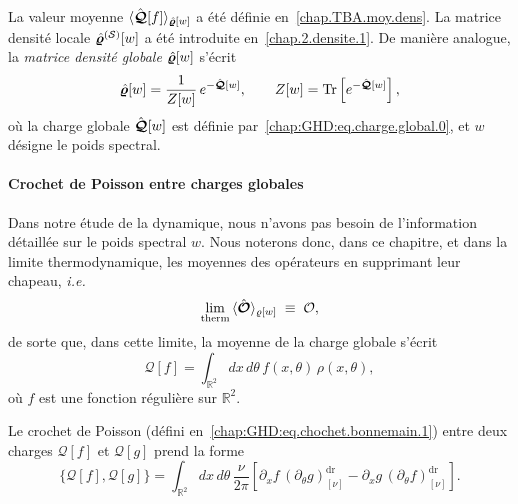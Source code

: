 \medskip

La valeur moyenne $\langle \hat{\bm{\mathcal{Q}}}[f] \rangle_{\hat{\bm{\varrho}}[w]}$ a été définie en~\eqref{chap.TBA.moy.dens}.  
La matrice densité locale $\hat{\bm{\varrho}}^{(\mathcal{S})}[w]$ a été introduite en~\eqref{chap.2.densite.1}.  
De manière analogue, la \emph{matrice densité globale} $\hat{\bm{\varrho}}[w]$ s’écrit
\begin{equation}\label{chap:GHD:eq.charge.global.2}
	\hat{\bm{\varrho}}[w] 
	= \frac{1}{Z[w]}\, e^{-\hat{\bm{\mathcal{Q}}}[w]}, 
	\qquad  
	Z[w] = \mathrm{Tr} \left[ e^{-\hat{\bm{\mathcal{Q}}}[w]} \right],
\end{equation}
où la charge globale $\hat{\bm{\mathcal{Q}}}[w]$ est définie par~\eqref{chap:GHD:eq.charge.global.0}, et $w$ désigne le poids spectral.  


\medskip

\paragraph{Crochet de Poisson entre charges globales}  
Dans notre étude de la dynamique, nous n’avons pas besoin de l’information détaillée sur le poids spectral $w$.  
Nous noterons donc, dans ce chapitre, et dans la limite thermodynamique, les moyennes des opérateurs en supprimant leur chapeau, \emph{i.e.}
\begin{equation}
\underset{\mathrm{therm}}{\lim} \, \langle \hat{\bm{\mathcal{O}}} \rangle_{\varrho[w]} \; \equiv \; \mathcal{O},
\end{equation}
de sorte que, dans cette limite, la moyenne de la charge globale s’écrit
\begin{equation}\label{chap:GHD:eq.charge.global.1}
	\mathcal{Q}[f] 
	= \int_{\mathbb{R}^2} dx\, d\theta\, f(x, \theta)\, \rho(x, \theta),
\end{equation}
où $f$ est une fonction régulière sur $\mathbb{R}^2$.

\medskip

Le crochet de Poisson (défini en~\eqref{chap:GHD:eq.chochet.bonnemain.1}) entre deux charges $\mathcal{Q}[f]$ et $\mathcal{Q}[g]$ prend la forme
\begin{equation}\label{chap:GHD:eq.chochet.bonnemain.2}
	\{\mathcal{Q}[f], \mathcal{Q}[g]\}
	= \int_{\mathbb{R}^2} dx\, d\theta\, \frac{\nu}{2\pi} 
	\left[ \partial_x f \, (\partial_\theta g)^{\mathrm{dr}}_{[\nu]} 
	     - \partial_x g \, (\partial_\theta f)^{\mathrm{dr}}_{[\nu]} \right].
\end{equation}

